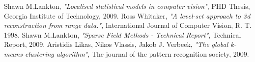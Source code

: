 \begin{thebibliography}{9}

  Shawn M.Lankton,
  \emph{"Localised statistical models in computer vision"},
  PHD Thesis,
  Georgia Institute of Technology,
  2009.
  Ross Whitaker,
  \emph{"A level-set approach to 3d reconstruction from range data."},
  International Journal of Computer Vision,
  R. T. 1998.
  Shawn M.Lankton,
  \emph{"Sparse Field Methods - Technical Report"},
  Technical Report,
  2009.
  Aristidis Likas, Nikos Vlassis, Jakob J. Verbeek,
  \emph{"The global k-means clustering algorithm"},
  The journal of the pattern recognition society,
  2009.



\end{thebibliography}